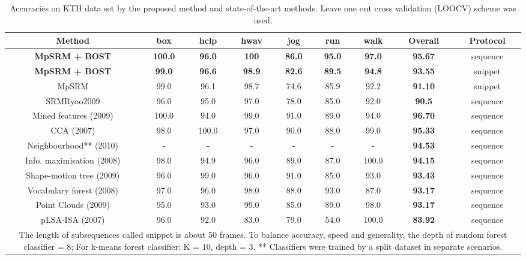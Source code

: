 \begin{sidewaystable}
\centering
{\footnotesize
\begin{tabular}{|c|c|c|c|c|c|c|c|c|}
\hline
Method & box & hclp & hwav & jog & run & walk & \textbf{ Overall} & Protocol \\
\hline
\textbf{ \color{blue} MpSRM + BOST} & \textbf{ \color{blue} 100.0} & \textbf{ \color{blue}96.0} & \textbf{ \color{blue}100} & \textbf{ \color{blue}86.0} & \textbf{ \color{blue}95.0} & \textbf{ \color{blue}97.0} & \textbf{ \color{blue}95.67} & sequence\\
\textbf{ \color{blue} MpSRM + BOST} & \textbf{ \color{blue} 99.0} & \textbf{ \color{blue} 96.6} & \textbf{ \color{blue}98.9} & \textbf{ \color{blue}82.6} & \textbf{ \color{blue}89.5} & \textbf{ \color{blue}94.8} & \textbf{ \color{blue} 93.55} & snippet\\
MpSRM & 99.0 & 96.1 & 98.7 & 74.6 & 85.9 & 92.2 & \textbf{ 91.10} & snippet\\
SRM{Ryoo2009} & 96.0 & 95.0 & 97.0 & 78.0 & 85.0 & 92.0 & \textbf{ 90.5} & sequence\\
\hline
Mined features (2009) \cite{Gilbert2009} & 100.0 & 94.0 & 99.0 & 91.0 & 89.0 & 94.0 & \textbf{ 96.70} & sequence\\
CCA (2007) \cite{Kim2007} & 98.0 & 100.0 & 97.0 & 90.0 & 88.0 & 99.0 & \textbf{ 95.33} & sequence\\
Neighbourhood** (2010) \cite{Kovashka2010} & - & - & - & - & - & - & \textbf{ 94.53} & sequence\\
Info. maximisation (2008) \cite{Liu2008} & 98.0 & 94.9 & 96.0 & 89.0 & 87.0 & 100.0 & \textbf{ 94.15} & sequence\\
Shape-motion tree (2009) \cite{Lin2009} & 96.0 & 99.0 & 96.0 & 91.0 & 85.0 & 93.0 & \textbf{ 93.43} & sequence\\
Vocabulary forest (2008) \cite{Mikolajczyk2008} & 97.0 & 96.0 & 98.0 & 88.0 & 93.0 & 87.0 & \textbf{ 93.17} & sequence\\
Point Clouds (2009) \cite{Bregonzio2009} & 95.0 & 93.0 & 99.0 & 85.0 & 89.0 & 98.0 & \textbf{ 93.17} & sequence\\
pLSA-ISA (2007) \cite{Wong2007} & 96.0 & 92.0 & 83.0 & 79.0 & 54.0 & 100.0 & \textbf{ 83.92} & sequence\\
\hline
\multicolumn{9}{p{0.9\linewidth}}{\scriptsize * The length of subsequences called snippet is about 50 frames. To balance accuracy, speed and generality, the depth of random forest classifier = $8$; For k-means forest classifier: K = $10$, depth = $3$. ** Classifiers were trained by a split dataset in separate scenarios.
}\\
\end{tabular}
}
\caption{Accuracies on KTH data set by the proposed method and state-of-the-art methods. Leave one out cross validation (LOOCV) scheme was used.}
\label{tab/act/compare}
\end{sidewaystable}
